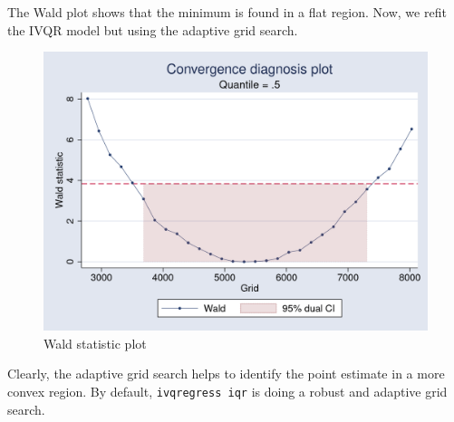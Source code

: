 The Wald plot shows that the minimum is found in a flat region. Now, we refit
the IVQR model but using the adaptive grid search.

\begin{stlog}

\end{stlog}

\begin{figure}[H]
\caption{Wald statistic plot}
\label{fig:dualci}
\centering
\includegraphics[scale=0.3]{eps/waldplot_asset2}
\end{figure}

Clearly, the adaptive grid search helps to identify the point estimate in a more
convex region.  By default, {\tt ivqregress iqr} is doing a robust and
adaptive grid search.

